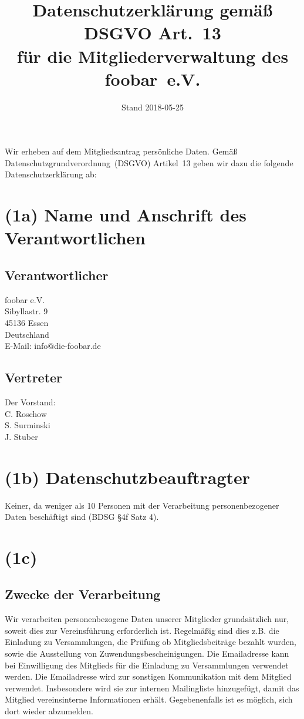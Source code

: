 \documentclass{article}
\title{Datenschutzerklärung gemäß DSGVO Art.~13\\
    für die Mitgliederverwaltung des foobar~e.V.}
\date{Stand 2018-05-25}
\begin{document}
\maketitle

Wir erheben auf dem Mitgliedsantrag persönliche Daten.
Gemäß Datenschutzgrundverordnung~(DSGVO) Artikel~13 geben wir dazu die
folgende Datenschutzerklärung ab:


\section*{(1a) Name und Anschrift des Verantwortlichen}

\subsection*{Verantwortlicher}

foobar e.V.\\
Sibyllastr. 9\\
45136 Essen\\
Deutschland\\[2ex]
E-Mail: info@die-foobar.de


\subsection*{Vertreter}

Der Vorstand:\\[2ex]
C. Roschow\\
S. Surminski\\
J. Stuber


\section*{(1b) Datenschutzbeauftragter}

Keiner, da weniger als 10 Personen mit der Verarbeitung
personenbezogener Daten beschäftigt sind (BDSG §4f Satz 4).


\section*{(1c)}

\subsection*{Zwecke der Verarbeitung}

Wir verarbeiten personenbezogene Daten unserer Mitglieder grundsätzlich
nur, soweit dies zur Vereinsführung erforderlich ist.
Regelmäßig sind dies z.B. die Einladung zu Versammlungen,
die Prüfung ob Mitgliedsbeiträge bezahlt wurden,
sowie die Ausstellung von Zuwendungsbescheinigungen.
%
Die Emailadresse kann bei Einwilligung des Mitglieds für die Einladung
zu Versammlungen verwendet werden.
%
Die Emailadresse wird zur sonstigen Kommunikation mit dem Mitglied
verwendet. Insbesondere wird sie zur internen Mailingliste
hinzugefügt, damit das Mitglied vereinsinterne Informationen erhält.
Gegebenenfalls ist es möglich, sich dort wieder abzumelden.
\end{document}
